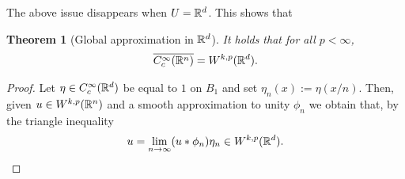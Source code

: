\documentclass[12pt]{article}
\newtheorem{theorem}{Theorem}
\theoremstyle{remark}
\begin{document}
The above issue disappears when $U =\mathbb{R}^d$. This shows that
\begin{theorem}[Global approximation in $\mathbb{R}^d$]\label{approx rd} It holds that for all $p<\infty$,
	\begin{align*}
		\overline{C_c^\infty(\mathbb{R}^n)}=W^{k,p}(\mathbb{R}^d).
	\end{align*}
\end{theorem}
\begin{proof}
	Let $\eta   \in C_c^\infty(\mathbb{R}^d)$ be equal to  $1$ on  $B_1$ and set $\eta  _n(x):=\eta  (x /n)$.  Then, given $u \in W^{k,p}(\mathbb{R}^n)$ and a smooth approximation to unity $\phi_n$ we obtain that, by the triangle inequality
	\begin{align*}
		u= \lim_{n \to \infty}(u*\phi_n)\eta  _n \in W^{k,p}(\mathbb{R}^d).
	\end{align*}
\end{proof}
\end{document}
